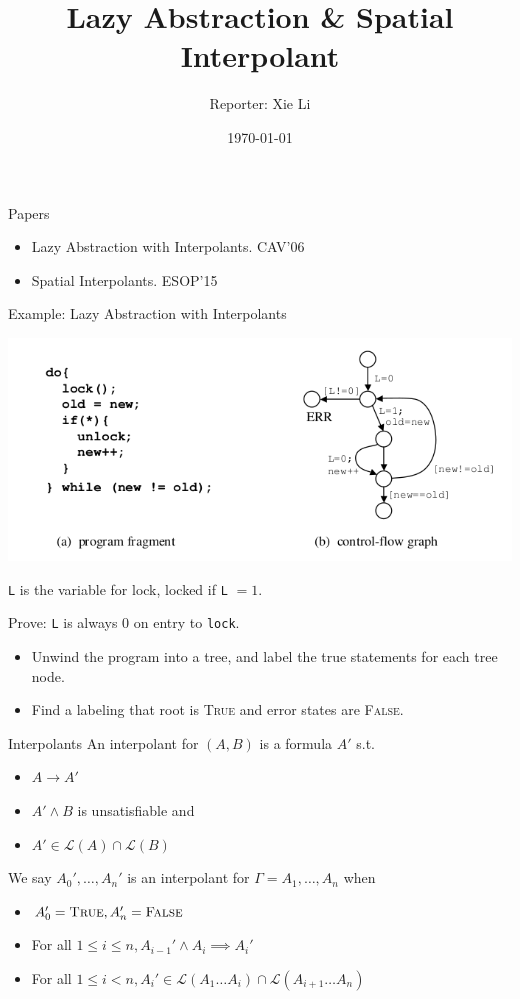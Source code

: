 \documentclass[aspectratio=1610, 13pt]{beamer}
\title{Lazy Abstraction \& Spatial Interpolant}
\author{Reporter:  Xie Li}
\date{\today}
\begin{document}
\maketitle
\begin{frame}{Papers}
\begin{itemize}
\item Lazy Abstraction with Interpolants. CAV'06
\item Spatial Interpolants. ESOP'15
\end{itemize}
\end{frame}

\begin{frame}{Example: Lazy Abstraction with Interpolants}
\begin{center}
\includegraphics[scale=0.4]{0.png}
\end{center}

\texttt{L} is the variable for lock, locked if \texttt{L} $= 1$.

Prove: \texttt{L} is always $0$ on entry to \texttt{lock}. 

\begin{itemize}
\item 
Unwind the program into a tree, and label the true statements for each tree node.
\item Find a labeling that root is \textsc{True} and error states are \textsc{False}.
\end{itemize}

\end{frame}

\begin{frame}{Interpolants}
An interpolant  for $(A, B)$ is a formula $A'$ s.t.
\begin{itemize}
\item $A\rightarrow A'$
\item $A' \wedge B$ is unsatisfiable and 
\item $A' \in \mathcal{L}(A) \cap \mathcal{L}(B)$
\end{itemize}

We say $A_0', \ldots, A_n'$ is an interpolant for $\Gamma = A_1, \ldots, A_n$ when
\begin{itemize}
\item $A_0' = \textsc{True}, A_n' = \textsc{False}$
\item For all $ 1 \le i \le n, A_{i-1}'\wedge A_i\implies A_i'$
\item For all $ 1 \le i < n, A_i'\in \mathcal{L}(A_1\ldots A_i) \cap \mathcal{L}(A_{i+1}\ldots A_n)$
\end{itemize}
\end{frame}
\end{document}
